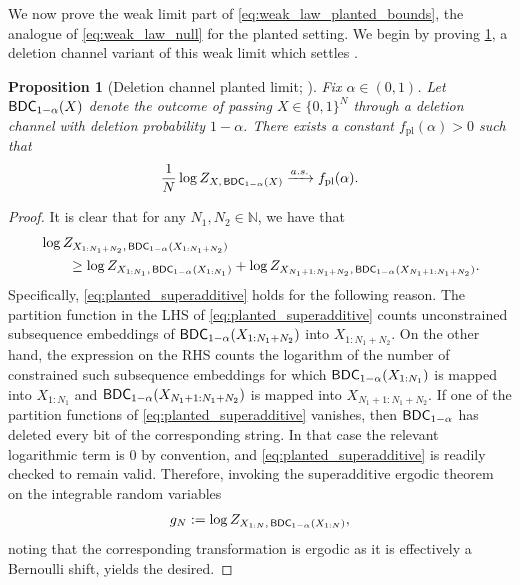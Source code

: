 \documentclass[11pt]{amsart}
\numberwithin{equation}{section}
\numberwithin{equation}{section}
\newcommand{\1}{\mathbbm{1}}
\newcommand{\N}{\mathbb{N}}
\newcommand{\BDC}{\textup{\textsf{BDC}}}
\newcommand{\fpl}{f_{\mathrm{pl}}}
\newtheorem{proposition}[theorem]{Proposition}
\theoremstyle{definition}
\begin{document}
We now prove the weak limit part of \eqref{eq:weak_law_planted_bounds}, the analogue of \eqref{eq:weak_law_null} for the planted setting. We begin by proving \cref{prop:subset_weak_limit_planted_deletion_channel}, a deletion channel variant of this weak limit which settles \cite[Conjecture 1]{pernice2024mutual}.

\begin{proposition}[{Deletion channel planted limit; \cite[Conjecture 1]{pernice2024mutual}}] \label{prop:subset_weak_limit_planted_deletion_channel}
    Fix $\alpha \in (0,1)$. Let $\BDC_{1-\alpha}(X)$ denote the outcome of passing $X \in \{0,1\}^N$ through a deletion channel with deletion probability $1 - \alpha$. There exists a constant $\fpl(\alpha) > 0$ such that
    \begin{align} \label{eq:random_subset_weak_law}
        \frac{1}{N} \log Z_{X,\, \BDC_{1-\alpha}(X)} \xrightarrow{a.s.} \fpl(\alpha).
    \end{align}
\end{proposition}

\begin{proof}
    It is clear that for any $N_1, N_2 \in \N$, we have that
    \begin{align}
        & \log Z_{X_{1:N_1+N_2},\, \BDC_{1-\alpha}(X_{1:N_1+N_2})} \nonumber \\
        & \qquad \geq \log Z_{X_{1:N_1},\, \BDC_{1-\alpha}(X_{1:N_1})} + \log Z_{X_{N_1+1:N_1+N_2},\, \BDC_{1-\alpha}(X_{N_1+1:N_1+N_2})}. \label{eq:planted_superadditive}
    \end{align}
    Specifically, \eqref{eq:planted_superadditive} holds for the following reason. The partition function in the LHS of \eqref{eq:planted_superadditive} counts unconstrained subsequence embeddings of $\BDC_{1-\alpha}(X_{1:N_1+N_2})$ into $X_{1:N_1+N_2}$. On the other hand, the expression on the RHS counts the logarithm of the number of constrained such subsequence embeddings for which $\BDC_{1-\alpha}(X_{1:N_1})$ is mapped into $X_{1:N_1}$ and $\BDC_{1-\alpha}(X_{N_1+1:N_1+N_2})$ is mapped into $X_{N_1+1:N_1+N_2}$. If one of the partition functions of \eqref{eq:planted_superadditive} vanishes, then $\BDC_{1-\alpha}$ has deleted every bit of the corresponding string. In that case the relevant logarithmic term is $0$ by convention, and \eqref{eq:planted_superadditive} is readily checked to remain valid. Therefore, invoking the superadditive ergodic theorem \cite{kingman1973subadditive} on the integrable random variables
    \begin{align*}
        g_N := \log Z_{X_{1:N},\, \BDC_{1-\alpha}(X_{1:N})},
    \end{align*}
    noting that the corresponding transformation is ergodic as it is effectively a Bernoulli shift, yields the desired.
\end{proof}
\end{document}
